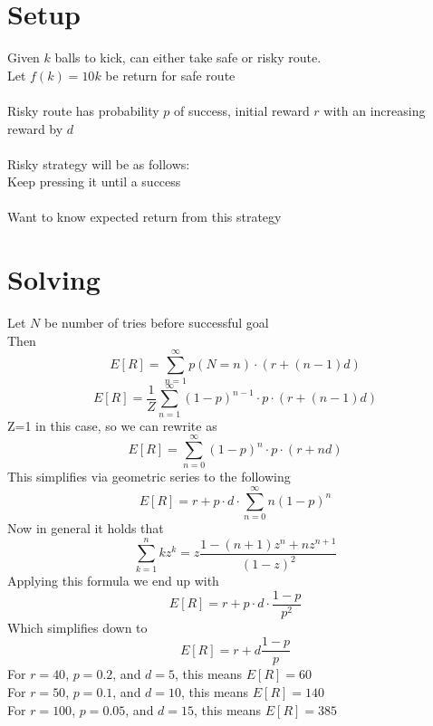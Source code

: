\documentclass[twoside,11pt]{article}
\theoremstyle{definition}
\begin{document}
\section{Setup}

Given $k$ balls to kick, can either take safe or risky route. \\
Let $f(k)=10k$ be return for safe route\\
\\
Risky route has probability $p$ of success, initial reward $r$ with an increasing reward by $d$\\
\\
Risky strategy will be as follows:\\
Keep pressing it until a success\\
\\
Want to know expected return from this strategy\\

\section{Solving}

Let $N$ be number of tries before successful goal\\
Then 
\[
E[R] = \sum_{n=1}^{\infty} p(N=n) \cdot (r+(n-1)d)
\]
\[
E[R] = \frac{1}{Z} \sum_{n=1}^{\infty} (1-p)^{n-1} \cdot p \cdot (r+(n-1)d)
\]
Z=1 in this case, so we can rewrite as
\[
E[R] = \sum_{n=0}^{\infty} (1-p)^{n} \cdot p \cdot (r+nd)
\]
This simplifies via geometric series to the following
\[
E[R] = r + p \cdot d \cdot \sum_{n=0}^{\infty} n (1-p)^n
\]
Now in general it holds that
\[
\sum_{k=1}^n k z^k = z \frac{1 - (n+1)z^n + n z^{n+1}}{(1-z)^2}
\]
Applying this formula we end up with
\[
E[R] = r + p \cdot d \cdot \frac{1-p}{p^2}
\]
Which simplifies down to
\[
E[R] = r + d \frac{1-p}{p}
\]
For $r=40$, $p=0.2$, and $d=5$, this means $E[R] = 60$\\
For $r=50$, $p=0.1$, and $d=10$, this means $E[R] = 140$\\
For $r=100$, $p=0.05$, and $d=15$, this means $E[R] = 385$
\end{document}
